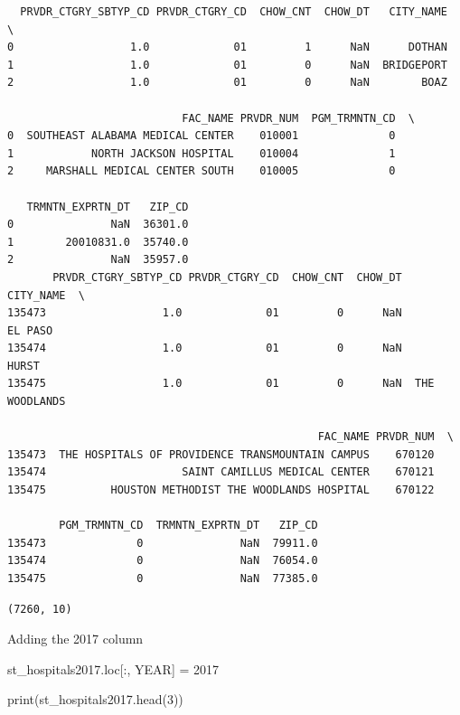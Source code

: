 \documentclass[
  letterpaper,
  DIV=11,
  numbers=noendperiod]{scrartcl}
\newenvironment{Shaded}{\begin{snugshade}}{\end{snugshade}}
\newcommand{\BuiltInTok}[1]{\textcolor[rgb]{0.00,0.23,0.31}{#1}}
\newcommand{\DecValTok}[1]{\textcolor[rgb]{0.68,0.00,0.00}{#1}}
\newcommand{\NormalTok}[1]{\textcolor[rgb]{0.00,0.23,0.31}{#1}}
\newcommand{\OperatorTok}[1]{\textcolor[rgb]{0.37,0.37,0.37}{#1}}
\newcommand{\StringTok}[1]{\textcolor[rgb]{0.13,0.47,0.30}{#1}}
\begin{document}
\begin{verbatim}
  PRVDR_CTGRY_SBTYP_CD PRVDR_CTGRY_CD  CHOW_CNT  CHOW_DT   CITY_NAME  \
0                  1.0             01         1      NaN      DOTHAN   
1                  1.0             01         0      NaN  BRIDGEPORT   
2                  1.0             01         0      NaN        BOAZ   

                           FAC_NAME PRVDR_NUM  PGM_TRMNTN_CD  \
0  SOUTHEAST ALABAMA MEDICAL CENTER    010001              0   
1            NORTH JACKSON HOSPITAL    010004              1   
2     MARSHALL MEDICAL CENTER SOUTH    010005              0   

   TRMNTN_EXPRTN_DT   ZIP_CD  
0               NaN  36301.0  
1        20010831.0  35740.0  
2               NaN  35957.0  
       PRVDR_CTGRY_SBTYP_CD PRVDR_CTGRY_CD  CHOW_CNT  CHOW_DT      CITY_NAME  \
135473                  1.0             01         0      NaN        EL PASO   
135474                  1.0             01         0      NaN          HURST   
135475                  1.0             01         0      NaN  THE WOODLANDS   

                                                FAC_NAME PRVDR_NUM  \
135473  THE HOSPITALS OF PROVIDENCE TRANSMOUNTAIN CAMPUS    670120   
135474                     SAINT CAMILLUS MEDICAL CENTER    670121   
135475          HOUSTON METHODIST THE WOODLANDS HOSPITAL    670122   

        PGM_TRMNTN_CD  TRMNTN_EXPRTN_DT   ZIP_CD  
135473              0               NaN  79911.0  
135474              0               NaN  76054.0  
135475              0               NaN  77385.0  
\end{verbatim}

\begin{verbatim}
(7260, 10)
\end{verbatim}

Adding the 2017 column

\begin{Shaded}
\begin{Highlighting}[]
\NormalTok{st\_hospitals2017.loc[:, }\StringTok{\textquotesingle{}YEAR\textquotesingle{}}\NormalTok{] }\OperatorTok{=} \DecValTok{2017}

\BuiltInTok{print}\NormalTok{(st\_hospitals2017.head(}\DecValTok{3}\NormalTok{))}
\end{Highlighting}
\end{Shaded}
\end{document}
